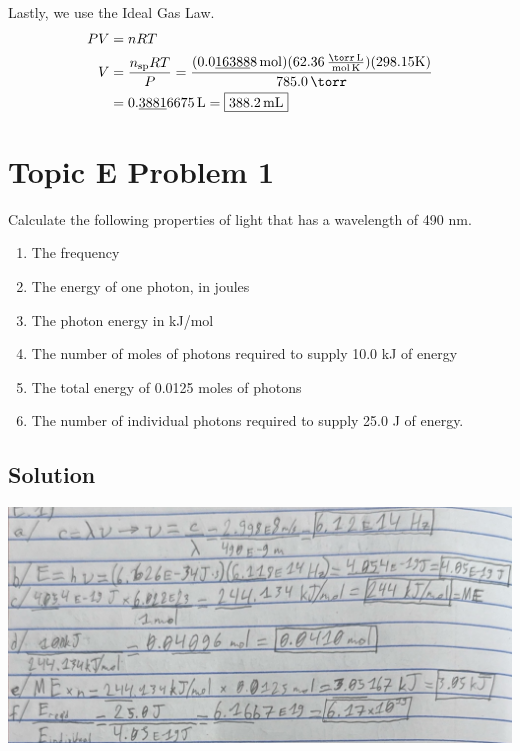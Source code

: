 \documentclass[10pt]{article}
\newcommand{\U}[1]{\underline{#1}}
\begin{document}
            Lastly, we use the Ideal Gas Law.
            \begin{align}
                PV  &=  nRT\\
                V   &=  \frac{n_{\rm sp} RT}{P}
                    =   \frac{(0.0\U{16388}8\,\unit{\mole})(62.36\,\unit{\frac{\torr\,\liter}{\mole\,\kelvin}})(298.15\unit{\kelvin})}{785.0\,\unit{\torr}}\\
                    &=  0.\U{3881}6675\,\unit{\liter}
                    =   \boxed{388.2\,\unit{\milli\liter}}
            \end{align}

    \setcounter{section}{0}
    \pagebreak
    \section{Topic E Problem 1}
        Calculate the following properties of light that has a wavelength of 490 nm.
        \begin{enumerate}[label=\alph*)]
            \item   The frequency
            \item   The energy of one photon, in joules
            \item   The photon energy in kJ/mol
            \item   The number of moles of photons required to supply 10.0 kJ of energy
            \item   The total energy of 0.0125 moles of photons
            \item   The number of individual photons required to supply 25.0 J of energy.
        \end{enumerate}

        \subsection{Solution}
            \begin{center}
                \includegraphics[width=\textwidth]{Answers Images/E1.jpg}
            \end{center}
\end{document}
